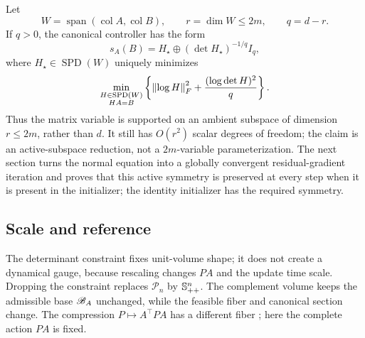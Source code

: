 Let
\[
  W=\operatorname{span}(\operatorname{col}A,\operatorname{col}B),
  \qquad r=\dim W\le2m,
  \qquad q=d-r.
\]
If \(q>0\), the canonical controller has the form
\begin{equation}
  s_A(B)=H_\star\oplus(\det H_\star)^{-1/q}I_q,
  \label{eq:active-controller}
\end{equation}
where \(H_\star\in\operatorname{SPD}(W)\) uniquely minimizes
\begin{equation}
  \min_{\substack{H\in\operatorname{SPD}(W)\\HA=B}}
  \left\{\left\lVert \log H\right\rVert_F^2+\frac{(\log\det H)^2}{q}\right\}.
  \label{eq:active-controller-problem}
\end{equation}
Thus the matrix variable is supported on an ambient subspace of dimension
\(r\le2m\), rather than \(d\).  It still has \(O(r^2)\) scalar degrees of
freedom; the claim is an active-subspace reduction, not a \(2m\)-variable
parameterization.
The next section turns the normal equation into a globally convergent
residual-gradient iteration and proves that this active symmetry is preserved
at every step when it is present in the initializer; the identity initializer
has the required symmetry.

\subsection{Scale and reference}

The determinant constraint fixes unit-volume shape; it does not create a
dynamical gauge, because rescaling changes \(PA\) and the update time scale.
Dropping the constraint replaces \(\mathscr P_n\) by \(\mathbb{S}_{++}^n\).  The
complement volume keeps the admissible base \(\mathscr B_A\) unchanged, while the
feasible fiber and canonical section change.  The compression
\(P\mapsto A^\top PA\) has a different fiber
\informationgeometrycite; here the complete action \(PA\) is
fixed.

